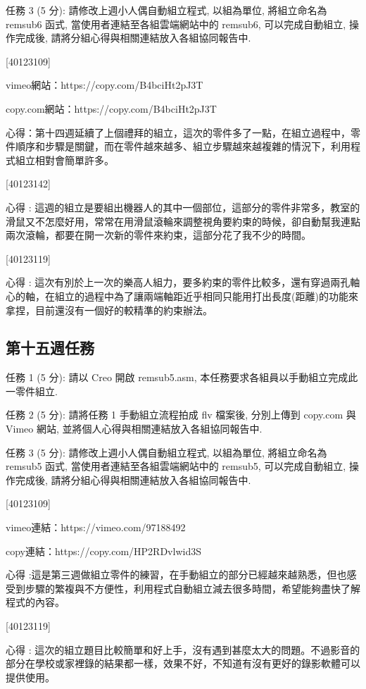 \documentclass[]{article}
\begin{document}
任務 3 (5 分): 請修改上週小人偶自動組立程式, 以組為單位, 將組立命名為
remsub6 函式, 當使用者連結至各組雲端網站中的 remsub6, 可以完成自動組立,
操作完成後, 請將分組心得與相關連結放入各組協同報告中.

{[}40123109{]}

vimeo網站：https://copy.com/B4bciHt2pJ3T

copy.com網站：https://copy.com/B4bciHt2pJ3T

心得：第十四週延續了上個禮拜的組立，這次的零件多了一點，在組立過程中，零件順序和步驟是關鍵，而在零件越來越多、組立步驟越來越複雜的情況下，利用程式組立相對會簡單許多。

{[}40123142{]}

心得 :
這週的組立是要組出機器人的其中一個部位，這部分的零件非常多，教室的滑鼠又不怎麼好用，常常在用滑鼠滾輪來調整視角要約束的時候，卻自動幫我連點兩次滾輪，都要在開一次新的零件來約束，這部分花了我不少的時間。

{[}40123119{]}

心得 :
這次有別於上一次的樂高人組力，要多約束的零件比較多，還有穿過兩孔軸心的軸，在組立的過程中為了讓兩端軸距近乎相同只能用打出長度(距離)的功能來拿捏，目前還沒有一個好的較精準的約束辦法。

\subsection{第十五週任務}\label{ux7b2cux5341ux4e94ux9031ux4efbux52d9}

任務 1 (5 分): 請以 Creo 開啟 remsub5.asm,
本任務要求各組員以手動組立完成此一零件組立.

任務 2 (5 分): 請將任務 1 手動組立流程拍成 flv 檔案後, 分別上傳到
copy.com 與 Vimeo 網站, 並將個人心得與相關連結放入各組協同報告中.

任務 3 (5 分): 請修改上週小人偶自動組立程式, 以組為單位, 將組立命名為
remsub5 函式, 當使用者連結至各組雲端網站中的 remsub5, 可以完成自動組立,
操作完成後, 請將分組心得與相關連結放入各組協同報告中.

{[}40123109{]}

vimeo連結：https://vimeo.com/97188492

copy連結：https://copy.com/HP2RDvlwid3S

心得
:這是第三週做組立零件的練習，在手動組立的部分已經越來越熟悉，但也感受到步驟的繁複與不方便性，利用程式自動組立減去很多時間，希望能夠盡快了解程式的內容。

{[}40123119{]}

心得 :
這次的組立題目比較簡單和好上手，沒有遇到甚麼太大的問題。不過影音的部分在學校或家裡錄的結果都一樣，效果不好，不知道有沒有更好的錄影軟體可以提供使用。
\end{document}

